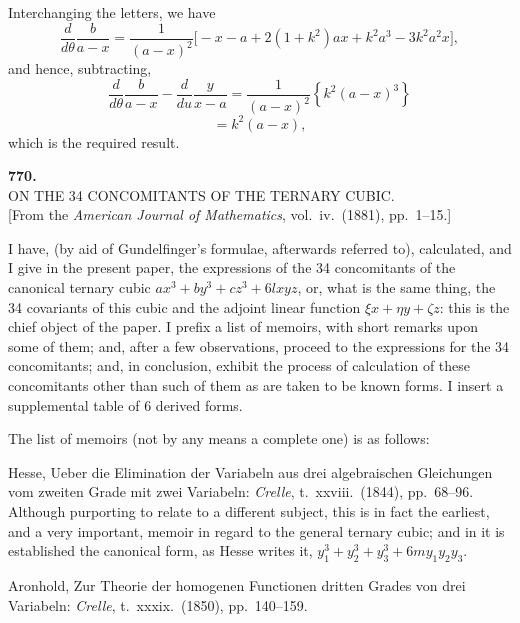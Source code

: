 \documentclass[11pt,a4paper]{article}
\begin{document}
Interchanging the letters, we have
\[
  \frac{d}{d\theta}\frac{b}{a-x}=\frac{1}{(a-x)^{2}}\bigl[-x-a+2(1+k^{2})ax+k^{2}a^{3}-3k^{2}a^{2}x\bigr],
\]
and hence, subtracting,
\[
  \frac{d}{d\theta}\frac{b}{a-x}-\frac{d}{du}\frac{y}{x-a}=\frac{1}{(a-x)^{2}}\!\left\{k^{2}(a-x)^{3}\right\}
\]
\[
  =k^{2}(a-x),
\]
which is the required result.

\bigskip


\newpage
\begin{center}
\textbf{770.}\\[4pt]
\textsc{ON THE 34 CONCOMITANTS OF THE TERNARY CUBIC.}\\[4pt]
[From the \textit{American Journal of Mathematics}, vol.\ iv.\ (1881),
pp.\ 1--15.]
\end{center}

\bigskip

\noindent
I have, (by aid of Gundelfinger's formulae, afterwards referred to),
calculated, and I give in the present paper, the expressions of the 34
concomitants of the canonical ternary cubic $ax^{3}+by^{3}+cz^{3}+6lxyz$,
or, what is the same thing, the 34 covariants of this cubic and the
adjoint linear function $\xi x+\eta y+\zeta z$: this is the chief object
of the paper. I prefix a list of memoirs, with short remarks upon some
of them; and, after a few observations, proceed to the expressions for
the 34 concomitants; and, in conclusion, exhibit the process of
calculation of these concomitants other than such of them as are taken
to be known forms. I insert a supplemental table of 6 derived forms.

The list of memoirs (not by any means a complete one) is as follows:

\smallskip
\noindent
Hesse, Ueber die Elimination der Variabeln aus drei algebraischen
Gleichungen vom zweiten Grade mit zwei Variabeln: \textit{Crelle},
t.~xxviii.\ (1844), pp.\ 68--96. Although purporting to relate to a
different subject, this is in fact the earliest, and a very important,
memoir in regard to the general ternary cubic; and in it is established
the canonical form, as Hesse writes it,
$y_{1}^{3}+y_{2}^{3}+y_{3}^{3}+6my_{1}y_{2}y_{3}$.

\smallskip
\noindent
Aronhold, Zur Theorie der homogenen Functionen dritten Grades von drei
Variabeln: \textit{Crelle}, t.~xxxix.\ (1850), pp.\ 140--159.
\end{document}
